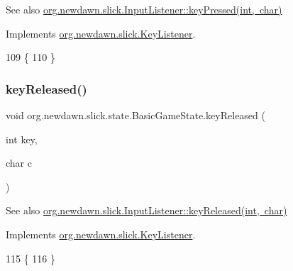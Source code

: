 \begin{DoxySeeAlso}{See also}
\mbox{\hyperlink{interfaceorg_1_1newdawn_1_1slick_1_1_key_listener_ac0b0568a21ef486c4f51382614c196ef}{org.\+newdawn.\+slick.\+Input\+Listener\+::key\+Pressed(int, char)}} 
\end{DoxySeeAlso}


Implements \mbox{\hyperlink{interfaceorg_1_1newdawn_1_1slick_1_1_key_listener_ac0b0568a21ef486c4f51382614c196ef}{org.\+newdawn.\+slick.\+Key\+Listener}}.


\begin{DoxyCode}
109                                             \{
110     \}
\end{DoxyCode}
\mbox{\label{classorg_1_1newdawn_1_1slick_1_1state_1_1_basic_game_state_ade382929c931cf15998df10559ae1f87}} 
\subsubsection{\texorpdfstring{key\+Released()}{keyReleased()}}
{\footnotesize\ttfamily void org.\+newdawn.\+slick.\+state.\+Basic\+Game\+State.\+key\+Released (\begin{DoxyParamCaption}\item[{int}]{key,  }\item[{char}]{c }\end{DoxyParamCaption})\hspace{0.3cm}{\ttfamily [inline]}}

\begin{DoxySeeAlso}{See also}
\mbox{\hyperlink{interfaceorg_1_1newdawn_1_1slick_1_1_key_listener_a474673b59bc77266bcef3c261c26ee2b}{org.\+newdawn.\+slick.\+Input\+Listener\+::key\+Released(int, char)}} 
\end{DoxySeeAlso}


Implements \mbox{\hyperlink{interfaceorg_1_1newdawn_1_1slick_1_1_key_listener_a474673b59bc77266bcef3c261c26ee2b}{org.\+newdawn.\+slick.\+Key\+Listener}}.


\begin{DoxyCode}
115                                              \{
116     \}
\end{DoxyCode}
\mbox{\label{classorg_1_1newdawn_1_1slick_1_1state_1_1_basic_game_state_ae9a3aab0c109cfe3f3aa56d1d6b4f33e}} 
